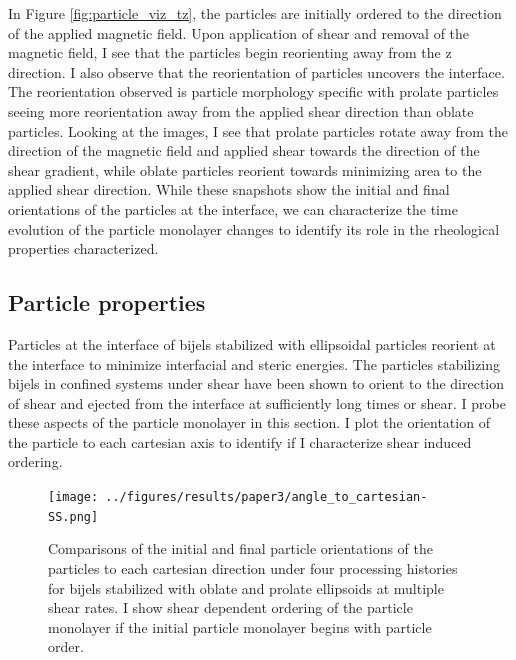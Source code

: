 In Figure \ref{fig:particle_viz_tz}, the particles are initially ordered to the direction of the applied magnetic field. Upon application of shear and removal
of the magnetic field, I see that the particles begin reorienting away from the z direction. I also observe that the reorientation of particles uncovers the interface.
The reorientation observed is particle morphology specific with prolate particles seeing more reorientation away from the applied shear direction than oblate particles.
Looking at the images, I see that prolate particles rotate away from the direction of the magnetic field and applied shear towards the direction of the shear gradient,
while oblate particles reorient towards minimizing area to the applied shear direction. While these snapshots show the initial and final orientations of the particles at the
interface, we can characterize the time evolution of the particle monolayer changes to identify its role in the rheological properties characterized.

\subsection{Particle properties}

Particles at the interface of bijels stabilized with ellipsoidal particles reorient at the interface to minimize interfacial and
steric energies. \cite{gunther_timescales_2014} The particles stabilizing bijels in confined systems under shear have been shown to
orient to the direction of shear and ejected from the interface at sufficiently long times or shear.\cite{bonaccorso_shear_2020} 
I probe these aspects of the particle monolayer in this section. I plot the orientation of the particle to each cartesian axis 
to identify if I characterize shear induced ordering.

\begin{figure} 
    \centering 
    \texttt{[image: ../figures/results/paper3/angle\_to\_cartesian-SS.png]} 
    \caption{Comparisons of the initial and final particle orientations of the particles to each cartesian direction under
             four processing histories for bijels stabilized with oblate and prolate ellipsoids at multiple shear rates. I show
             shear dependent ordering of the particle monolayer if the initial particle monolayer begins with particle order.} 
    \label{fig:particle_orientation_cartesian_shear} 
\end{figure}

